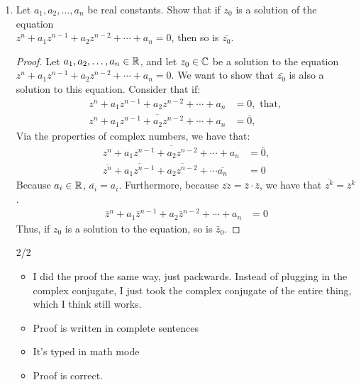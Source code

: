 \begin{enumerate}
	\item Let $a_1, a_2, \ldots, a_n$ be real constants. Show that if $z_0$ is a solution of the equation\\ $z^n +a_1z^{n-1} + a_2z^{n-2} + \cdots + a_n =0$, then so is $\bar{z_0}$.
    
    \begin{proof}
        Let $a_1, a_2, \ldots, a_n\in\mathbb{R}$, and let $z_0\in\mathbb{C}$ be a solution to the equation $z^n +a_1z^{n-1} + a_2z^{n-2} + \cdots + a_n =0$. We want to show that $\bar{z_0}$ is also a solution to this equation.\gline{}
        Consider that if:
        \begin{align*}
            z^n +a_1z^{n-1} + a_2z^{n-2} + \cdots + a_n &=0, \text{ that, }\\
            \overline{z^n +a_1z^{n-1} + a_2z^{n-2} + \cdots + a_n} &= \bar{0},
        \end{align*}
        Via the properties of complex numbers, we have that:
        \begin{align*}
            \overline{z^n +a_1z^{n-1} + a_2z^{n-2} + \cdots + a_n} &= \bar{0},\\
            \overline{z^n} + \overline{a_1z^{n-1}}+\overline{a_2z^{n-2}} + \cdots \overline{a_n} &= 0
        \end{align*}
        Because $a_i\in\mathbb{R}$, $\overline{a_i} = a_i$. Furthermore, because $\overline{zz}=\bar z\cdot\bar z$, we have that $\overline{z^k}=\overline{z}^k$.
        \begin{align*}
            \bar{z}^n + a_1 \bar{z}^{n-1} + a_2\bar{z}^{n-2}+\cdots + a_n &= 0
        \end{align*}
        Thus, if $z_0$ is a solution to the equation, so is $\bar z_0$. 
    \end{proof}
    \begin{grade}
        2/2
        \begin{itemize}[parsep=0pt, itemsep=0pt]
            \item I did the proof the same way, just packwards. Instead of plugging in the complex conjugate, I just took the complex conjugate of the entire thing, which I think still works.
            \item Proof is written in complete sentences
            \item It's typed in math mode
            \item Proof is correct. 
        \end{itemize}
    \end{grade}
    
\end{enumerate}




